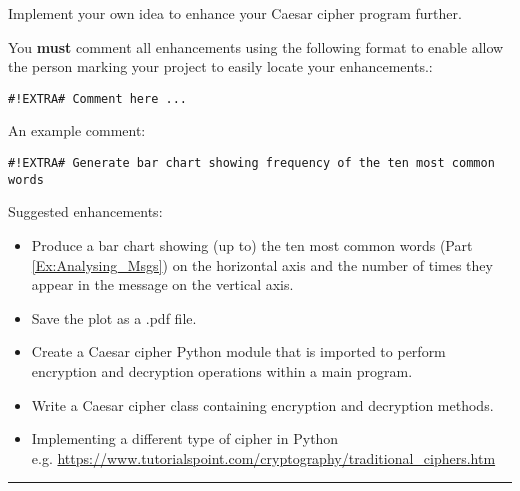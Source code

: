 \documentclass[11pt]{report}
\begin{document}



\begin{Exercise}[title = Enhancing your Program]

Implement your own idea to enhance your Caesar cipher program further. 

You \textbf{must} comment all enhancements using the following format to enable allow the person marking your project to easily locate your enhancements.:

\vspace{0.5em}
{\tt \#!EXTRA\# Comment here ...}
\vspace{0.5em}

An example comment:

\vspace{0.5em}
{\tt \#!EXTRA\# Generate bar chart showing frequency of the ten most common words}
\vspace{0.5em}

Suggested enhancements:
\begin{itemize}
    \item Produce a bar chart showing (up to) the ten most common words (Part \ref{Ex:Analysing_Msgs})  on the horizontal axis and the number of times they appear in the message on the vertical axis.
    \item Save the plot as a .pdf file.
    \item Create a Caesar cipher Python module that is imported to perform encryption and decryption operations within a main program. 
    \item Write a Caesar cipher class containing encryption and decryption methods.
    \item Implementing a different type of cipher in Python \\ e.g. \url{https://www.tutorialspoint.com/cryptography/traditional\_ciphers.htm}
    
    
\end{itemize}
\end{Exercise}

\vspace{1em}
\hrule
\vspace{1em}
\end{document}
